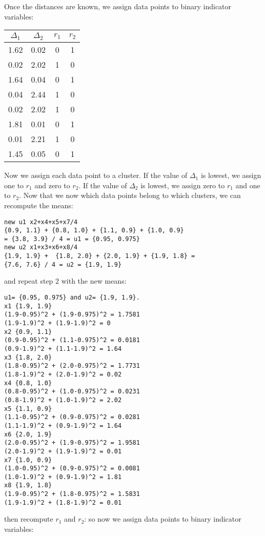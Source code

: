 Once the distances are known, we assign data points to binary indicator variables:
\begin{center}
 \begin{tabular}{||c c c c||} 
 \hline
 $\Delta_1$ & $\Delta_2$ & $r_1$ & $r_2$  \\ [0.5ex] 
 \hline\hline
 1.62 & 0.02 & 0 & 1 \\ 
 \hline
 0.02 & 2.02  & 1 & 0 \\ 
 \hline
1.64 & 0.04 & 0 & 1 \\
 \hline
0.04 & 2.44 & 1 & 0 \\
 \hline
 0.02 & 2.02 & 1 & 0 \\ 
  \hline
1.81 & 0.01 & 0 & 1 \\
 \hline
0.01 & 2.21 & 1 & 0 \\
 \hline
 1.45 & 0.05 & 0 & 1 \\ [1ex] 
 \hline
\end{tabular}
\end{center}
Now we assign each data point to a cluster. If the value of $\Delta_1$ is lowest, we assign one to $r_1$ and zero to $r_2$. If the value of $\Delta_2$ is lowest, we assign zero to $r_1$ and one to $r_2$. Now that we now which data points belong to which clusters, we can recompute the means:
\begin{verbatim}
new u1 x2+x4+x5+x7/4 
{0.9, 1.1} + {0.8, 1.0} + {1.1, 0.9} + {1.0, 0.9} 
= {3.8, 3.9} / 4 = u1 = {0.95, 0.975}
new u2 x1+x3+x6+x8/4 
{1.9, 1.9} +  {1.8, 2.0} + {2.0, 1.9} + {1.9, 1.8} = 
{7.6, 7.6} / 4 = u2 = {1.9, 1.9}
\end{verbatim}
and repeat step 2 with the new means:
\begin{verbatim}
u1= {0.95, 0.975} and u2= {1.9, 1.9}.
x1 {1.9, 1.9}
(1.9-0.95)^2 + (1.9-0.975)^2 = 1.7581
(1.9-1.9)^2 + (1.9-1.9)^2 = 0
x2 {0.9, 1.1}
(0.9-0.95)^2 + (1.1-0.975)^2 = 0.0181
(0.9-1.9)^2 + (1.1-1.9)^2 = 1.64
x3 {1.8, 2.0}
(1.8-0.95)^2 + (2.0-0.975)^2 = 1.7731
(1.8-1.9)^2 + (2.0-1.9)^2 = 0.02
x4 {0.8, 1.0}
(0.8-0.95)^2 + (1.0-0.975)^2 = 0.0231
(0.8-1.9)^2 + (1.0-1.9)^2 = 2.02
x5 {1.1, 0.9}
(1.1-0.95)^2 + (0.9-0.975)^2 = 0.0281
(1.1-1.9)^2 + (0.9-1.9)^2 = 1.64
x6 {2.0, 1.9}
(2.0-0.95)^2 + (1.9-0.975)^2 = 1.9581
(2.0-1.9)^2 + (1.9-1.9)^2 = 0.01
x7 {1.0, 0.9}
(1.0-0.95)^2 + (0.9-0.975)^2 = 0.0081
(1.0-1.9)^2 + (0.9-1.9)^2 = 1.81
x8 {1.9, 1.8}
(1.9-0.95)^2 + (1.8-0.975)^2 = 1.5831
(1.9-1.9)^2 + (1.8-1.9)^2 = 0.01
\end{verbatim}
then recompute $r_1$ and $r_2$:
so now we assign data points to binary indicator variables:
